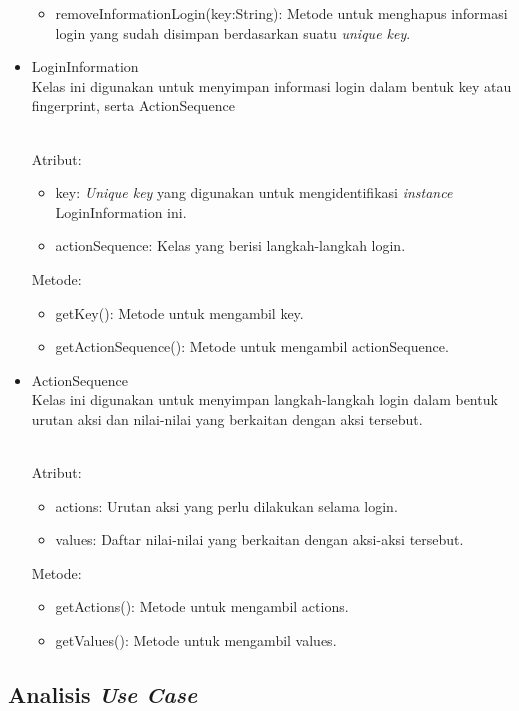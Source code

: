 \begin{itemize}
{\begin{itemize}
            \item{removeInformationLogin(key:String): Metode untuk menghapus informasi login yang sudah disimpan berdasarkan suatu \textit{unique key}.}
        \end{itemize}
    }
    \item{LoginInformation\\Kelas ini digunakan untuk menyimpan informasi login dalam bentuk key atau fingerprint, serta ActionSequence}
    {
        \\Atribut:
        \begin{itemize}
            \item{key: \textit{Unique key} yang digunakan untuk mengidentifikasi \textit{instance} LoginInformation ini.}
            \item{actionSequence: Kelas yang berisi langkah-langkah login.}
        \end{itemize}
        Metode:
        \begin{itemize}
            \item{getKey(): Metode untuk mengambil key.}
            \item{getActionSequence(): Metode untuk mengambil actionSequence.}
        \end{itemize}
    }
    \item{ActionSequence\\Kelas ini digunakan untuk menyimpan langkah-langkah login dalam bentuk urutan aksi dan nilai-nilai yang berkaitan dengan aksi tersebut.}
    {
        \\Atribut:
        \begin{itemize}
            \item{actions: Urutan aksi yang perlu dilakukan selama login.}
            \item{values: Daftar nilai-nilai yang berkaitan dengan aksi-aksi tersebut.}
        \end{itemize}
        Metode:
        \begin{itemize}
            \item{getActions(): Metode untuk mengambil actions.}
            \item{getValues(): Metode untuk mengambil values.}
        \end{itemize}
    }
\end{itemize}

\subsection{Analisis \textit{Use Case}}
\label{sec:analisis_use_case}

